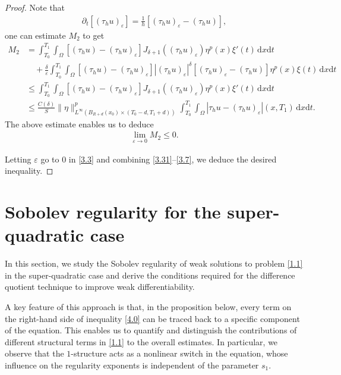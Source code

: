 \documentclass[reqno,10pt]{amsart}
\numberwithin{equation}{section}
\begin{document}
\begin{proof}
	Note that
	\begin{align*}
		\partial_t\left[ (\tau_hu)_{\varepsilon}\right]=\frac{1}{h}\left[(\tau_hu)_\varepsilon-(\tau_hu)\right],  
	\end{align*}
	one can estimate $M_2$ to get
	\begin{align*}
		M_2&=\int_{T_0}^{T_1}\int_{\Omega}\left[(\tau_hu)-(\tau_hu)_\varepsilon\right]J_{\delta+1}\left((\tau_hu)_\varepsilon\right)\eta^p(x)\xi'(t)\,\mathrm{d}x\mathrm{d}t\\
		&\quad+\frac{\delta}{\varepsilon}\int_{T_0}^{T_1}\int_{\Omega}\left[(\tau_hu)-(\tau_hu)_\varepsilon\right]\left|(\tau_hu)_\varepsilon\right|^\delta\left[(\tau_hu)_\varepsilon-(\tau_hu)\right]\eta^p(x)\xi(t)\,\mathrm{d}x\mathrm{d}t\\
		&\le \int_{T_0}^{T_1}\int_{\Omega}\left[(\tau_hu)-(\tau_hu)_\varepsilon\right]J_{\delta+1}\left((\tau_hu)_\varepsilon\right)\eta^p(x)\xi'(t)\,\mathrm{d}x\mathrm{d}t\\
		&\le \frac{C(\delta)}{S}\|\eta\|^p_{L^\infty\left(B_{R+d}(x_0)\times(T_0-d,T_1+d)\right)}\int_{T_0}^{T_1}\int_{\Omega}\left|\tau_hu-(\tau_hu)_\varepsilon\right|(x,T_1)\,\mathrm{d}x\mathrm{d}t.
	\end{align*}
	The above estimate enables us to deduce
	\begin{align}
		\label{3.7}
		\lim\limits_{\varepsilon\rightarrow0}M_2\le0.
	\end{align}
	
Letting $\varepsilon$ go to $0$ in \eqref{3.3} and combining \eqref{3.31}--\eqref{3.7}, we deduce the desired inequality.
\end{proof}

\section{Sobolev regularity  for the super-quadratic case}
\label{sec3} 
In this section, we study the Sobolev regularity of weak solutions to problem \eqref{1.1} in the super-quadratic case and derive the conditions required for the difference quotient technique to improve weak differentiability. 

A key feature of this approach is that, in the proposition below, every term on the right-hand side of inequality \eqref{4.0} can be traced back to a specific component of the equation. This enables us to quantify and distinguish the contributions of different structural terms in \eqref{1.1} to the overall estimates. In particular, we observe that the $1$-structure acts as a nonlinear switch in the equation, whose influence on the regularity exponents is independent of the parameter $s_1$.
\end{document}
